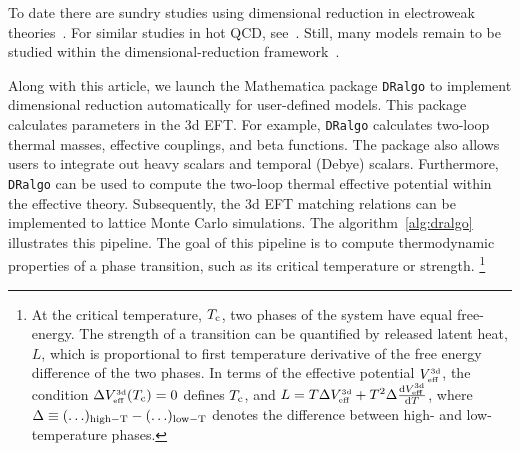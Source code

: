 \documentclass[11pt]{article}
\def\dralgo{{\tt DRalgo}}
\newcommand{\Tc}{T_{\rm c}}
\newcommand{\rmii}[1]{{\mbox{\tiny\rm{#1}}}}
\begin{document}
To date there are sundry studies using dimensional reduction in
electroweak theories~\cite{%
  Andersen:1996dh,Farakos:1994kx,Kajantie:1995dw,Andersen:1997ba,Kajantie:1997hn,
  Gould:2021dzl,Croon:2020cgk,Niemi:2021qvp,Niemi:2020hto,Andersen:2017ika,
  Niemi:2018asa,Hirvonen:2022jba,Rajantie:1997pr}.
For similar studies in hot QCD, see~\cite{Andersen:2015eoa,Andersen:2002ey}.
Still, many models remain to be studied within the dimensional-reduction framework~\cite{%
  Baum:2020vfl,Ivanov:2014doa,BhupalDev:2018xya,Appelquist:2002mw}.

Along with this article, we launch the Mathematica package \dralgo{} to implement
dimensional reduction automatically for user-defined models.
This package calculates parameters in the 3d EFT.
For example, \dralgo{} calculates
two-loop thermal masses,
effective couplings, and
beta functions.
The package also allows users to integrate out
heavy scalars and
temporal (Debye) scalars.
Furthermore, \dralgo{} can be used to compute
the two-loop thermal effective potential within the effective theory.
Subsequently,
the 3d EFT matching relations can be implemented to lattice Monte Carlo simulations.
The algorithm~\ref{alg:dralgo} illustrates this pipeline.
The goal of this pipeline is to compute thermodynamic properties of a phase transition,
such as its critical temperature or strength.%
\footnote{%
At the critical temperature, $\Tc$,
two phases of the system have equal free-energy.
The strength of a transition can be quantified by released latent heat, $L$,
which is proportional to first temperature derivative of the free energy difference of
the two phases.
In terms of the effective potential $V^{\rmii{3d}}_{\rmii{eff}}$,
the condition
$\Delta V^{\rmii{3d}}_{\rmii{eff}}(\Tc) = 0 $ defines $\Tc$, and
$L =
  T \Delta V^{\rmii{3d}}_{\rmii{eff}}
+ T^2 \Delta \frac{{\rm d} V^{\rmii{3d}}_{\rmii{eff}}}{{\rm d}T}$, where
$\Delta \equiv (\ldots)_{\rm{high-} T} - (\ldots)_{\rm{low-} T}$ denotes
the difference between high- and low-temperature phases.
}
\end{document}
